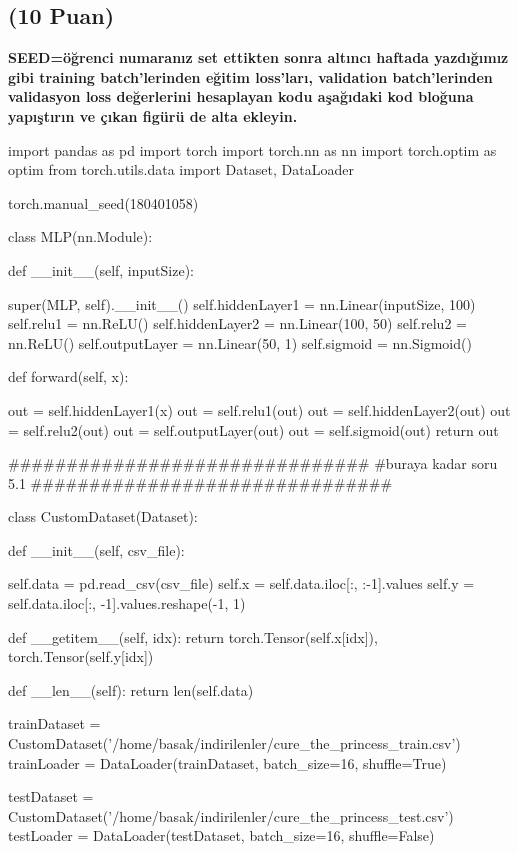 \documentclass[11pt]{article}
\begin{document}
\subsection{(10 Puan)} \textbf{SEED=öğrenci numaranız set ettikten sonra altıncı haftada yazdığımız gibi training batch'lerinden eğitim loss'ları, validation batch'lerinden validasyon loss değerlerini hesaplayan kodu aşağıdaki kod bloğuna yapıştırın ve çıkan figürü de alta ekleyin.}

\begin{python}
import pandas as pd
import torch
import torch.nn as nn
import torch.optim as optim
from torch.utils.data import Dataset, DataLoader

torch.manual_seed(180401058)

class MLP(nn.Module):

    def __init__(self, inputSize):

        super(MLP, self).__init__()
        self.hiddenLayer1 = nn.Linear(inputSize, 100)
        self.relu1 = nn.ReLU()
        self.hiddenLayer2 = nn.Linear(100, 50)
        self.relu2 = nn.ReLU()
        self.outputLayer = nn.Linear(50, 1)
        self.sigmoid = nn.Sigmoid()

    def forward(self, x):

        out = self.hiddenLayer1(x)
        out = self.relu1(out)
        out = self.hiddenLayer2(out)
        out = self.relu2(out)
        out = self.outputLayer(out)
        out = self.sigmoid(out)
        return out

###############################
#buraya kadar soru 5.1
###############################

class CustomDataset(Dataset):

    def __init__(self, csv_file):

        self.data = pd.read_csv(csv_file)
        self.x = self.data.iloc[:, :-1].values
        self.y = self.data.iloc[:, -1].values.reshape(-1, 1)

    def __getitem__(self, idx):
        return torch.Tensor(self.x[idx]), torch.Tensor(self.y[idx])

    def __len__(self):
        return len(self.data)

trainDataset = CustomDataset('/home/basak/indirilenler/cure_the_princess_train.csv')
trainLoader = DataLoader(trainDataset, batch_size=16, shuffle=True)

testDataset = CustomDataset('/home/basak/indirilenler/cure_the_princess_test.csv')
testLoader = DataLoader(testDataset, batch_size=16, shuffle=False)


\end{python}
\end{document}
